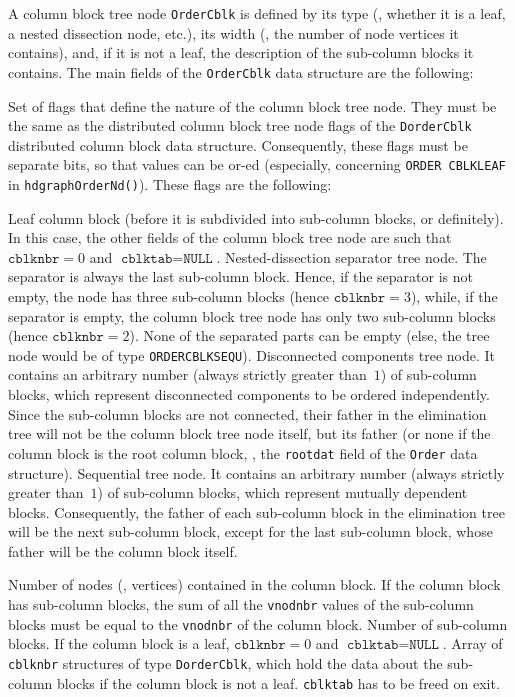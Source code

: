 A column block tree node \texttt{OrderCblk} is defined by its type
(\ie, whether it is a leaf, a nested dissection node, etc.), its width
(\ie, the number of node vertices it contains), and, if it is not a
leaf, the description of the sub-column blocks it contains.
The main fields of the \texttt{OrderCblk} data structure are the
following:
\begin{itemize}
  Set of flags that define the nature of the column block tree
  node. They must be the same as the distributed column block tree
  node flags of the \texttt{Dorder\lbt Cblk} distributed column block
  data structure. Consequently, these flags must be separate bits, so
  that values can be or-ed (especially, concerning \texttt{ORDER\lbt
  CBLK\lbt LEAF} in \texttt{hdgraph\lbt Order\lbt Nd()}).
  These flags are the following:
  \begin{itemize}
    Leaf column block (before it is subdivided into sub-column blocks,
    or definitely). In this case, the other fields of the column block
    tree node are such that $\texttt{cblknbr} = 0$ and
    $\texttt{cblktab} = \texttt{NULL}$.
    Nested-dissection separator tree node. The separator is always
    the last sub-column block. Hence, if the separator is not empty,
    the node has three sub-column blocks (hence $\texttt{cblknbr} =
    3$), while, if the separator is empty, the column block tree node
    has only two sub-column blocks (hence $\texttt{cblknbr} = 2$).
    None of the separated parts can be empty (else, the tree node
    would be of type \texttt{ORDER\lbt CBLK\lbt SEQU}).
    Disconnected components tree node. It contains an arbitrary number
    (always strictly greater than~$1$) of sub-column blocks, which
    represent disconnected components to be ordered
    independently. Since the sub-column blocks are not connected,
    their father in the elimination tree will not be the column block
    tree node itself, but its father (or none if the column block is
    the root column block, \ie, the \texttt{rootdat} field of the
    \texttt{Order} data structure).
    Sequential tree node. It contains an arbitrary number
    (always strictly greater than~$1$) of sub-column blocks, which
    represent mutually dependent blocks. Consequently, the father of
    each sub-column block in the elimination tree will be the next
    sub-column block, except for the last sub-column block, whose
    father will be the column block itself.
  \end{itemize}
  Number of nodes (\ie, vertices) contained in the column block. If
  the column block has sub-column blocks, the sum of all the
  \texttt{vnodnbr} values of the sub-column blocks must be equal to
  the \texttt{vnodnbr} of the column block.
  Number of sub-column blocks. If the column block is a leaf,
  $\texttt{cblknbr} = 0$ and $\texttt{cblktab} = \texttt{NULL}$.
  Array of \texttt{cblknbr} structures of type \texttt{DorderCblk},
  which hold the data about the sub-column blocks if the column block
  is not a leaf. \texttt{cblktab} has to be freed on exit.
\end{itemize}

